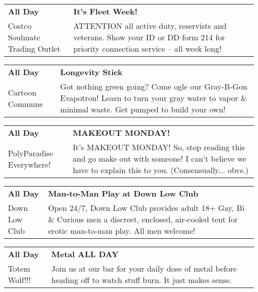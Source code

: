 \begin{tabular}{ p{1in} p{2.2in} }
    \textbf{All Day} & \textbf{It's Fleet Week!} \\
    Costco Soulmate Trading Outlet \newline  & ATTENTION all active duty, reservists and veterans. Show your ID or DD form 214 for priority connection service -- all week long! \\
    \hline 
\end{tabular}
    
\begin{tabular}{ p{1in} p{2.2in} }
    \textbf{All Day} & \textbf{Longevity Stick} \\
    Cartoon Commune \newline  & Got nothing green going? Come ogle our Gray-B-Gon Evapotron! Learn to turn your gray water to vapor \& minimal waste. Get pumped to build your own! \\
    \hline 
\end{tabular}
    
\begin{tabular}{ p{1in} p{2.2in} }
    \textbf{All Day} & \textbf{MAKEOUT MONDAY!} \\
    PolyParadise \newline Everywhere! & It's MAKEOUT MONDAY! So, stop reading this and go make out with someone! I can't believe we have to explain this to you. (Consensually... obvs.) \\
    \hline 
\end{tabular}
    
\begin{tabular}{ p{1in} p{2.2in} }
    \textbf{All Day} & \textbf{Man-to-Man Play at Down Low Club} \\
    Down Low Club \newline  & Open 24/7, Down Low Club provides adult 18+ Gay, Bi \& Curious men a discreet, enclosed, air-cooled tent for erotic man-to-man play. All men welcome! \\
    \hline 
\end{tabular}
    
\begin{tabular}{ p{1in} p{2.2in} }
    \textbf{All Day} & \textbf{Metal ALL DAY } \\
    Totem Wolf!!! \newline  & Join us at our bar for your daily dose of metal before heading off to watch stuff burn. It just makes sense. \\
    \hline 
\end{tabular}
    
